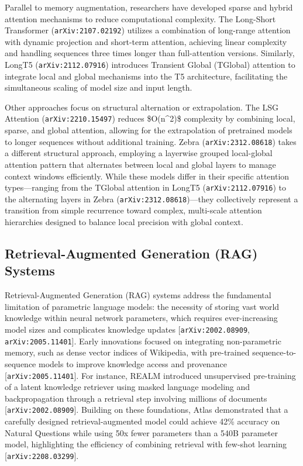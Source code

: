 \documentclass[11pt]{article}
\begin{document}
Parallel to memory augmentation, researchers have developed sparse and hybrid attention mechanisms to reduce computational complexity. The Long-Short Transformer (\texttt{arXiv:2107.02192}) utilizes a combination of long-range attention with dynamic projection and short-term attention, achieving linear complexity and handling sequences three times longer than full-attention versions. Similarly, LongT5 (\texttt{arXiv:2112.07916}) introduces Transient Global (TGlobal) attention to integrate local and global mechanisms into the T5 architecture, facilitating the simultaneous scaling of model size and input length.

Other approaches focus on structural alternation or extrapolation. The LSG Attention (\texttt{arXiv:2210.15497}) reduces \$O(n\textasciicircum{}2)\$ complexity by combining local, sparse, and global attention, allowing for the extrapolation of pretrained models to longer sequences without additional training. Zebra (\texttt{arXiv:2312.08618}) takes a different structural approach, employing a layerwise grouped local-global attention pattern that alternates between local and global layers to manage context windows efficiently. While these models differ in their specific attention types—ranging from the TGlobal attention in LongT5 (\texttt{arXiv:2112.07916}) to the alternating layers in Zebra (\texttt{arXiv:2312.08618})—they collectively represent a transition from simple recurrence toward complex, multi-scale attention hierarchies designed to balance local precision with global context.

\subsection{Retrieval-Augmented Generation (RAG) Systems}

Retrieval-Augmented Generation (RAG) systems address the fundamental limitation of parametric language models: the necessity of storing vast world knowledge within neural network parameters, which requires ever-increasing model sizes and complicates knowledge updates [\texttt{arXiv:2002.08909}, \texttt{arXiv:2005.11401}]. Early innovations focused on integrating non-parametric memory, such as dense vector indices of Wikipedia, with pre-trained sequence-to-sequence models to improve knowledge access and provenance [\texttt{arXiv:2005.11401}]. For instance, REALM introduced unsupervised pre-training of a latent knowledge retriever using masked language modeling and backpropagation through a retrieval step involving millions of documents [\texttt{arXiv:2002.08909}]. Building on these foundations, Atlas demonstrated that a carefully designed retrieval-augmented model could achieve 42\% accuracy on Natural Questions while using 50x fewer parameters than a 540B parameter model, highlighting the efficiency of combining retrieval with few-shot learning [\texttt{arXiv:2208.03299}].
\end{document}
